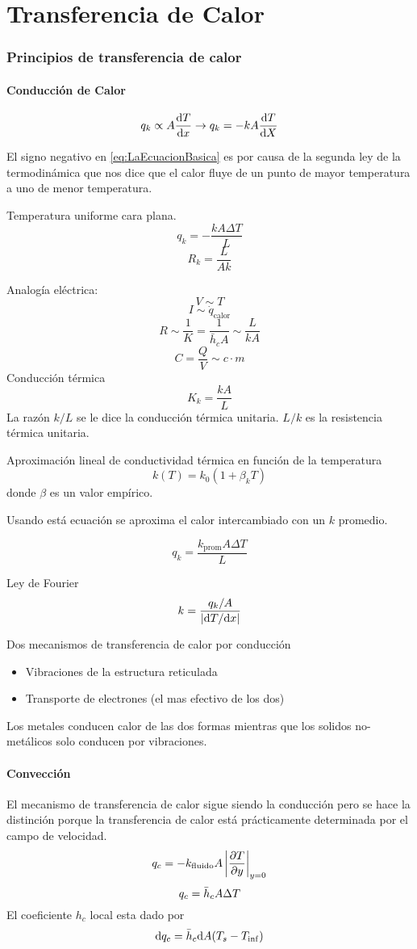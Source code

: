 \clearpage
\part{Transferencia de Calor}
\section{Principios de transferencia de calor}
\subsection{Conducción de Calor}
\begin{equation} \label{eq:LaEcuacionBasica}
    q_k\propto A\frac{\textrm{d} T}{\textrm{d} x}\rightarrow q_k=-kA\frac{\textrm{d} T}{\textrm{d} X}
\end{equation}

El signo negativo en \ref{eq:LaEcuacionBasica} es por causa de la segunda ley de la termodinámica que nos dice que el calor fluye de un punto de mayor temperatura a uno de menor temperatura.

Temperatura uniforme cara plana.
$$q_k=-\frac{kA\Delta T}{L} $$
$$R_k=\frac{L}{Ak}$$

Analogía eléctrica:
$$V\sim T $$
$$I \sim \dot{q}_{\text{calor}}$$
$$R\sim\frac{1}{K}= \frac{1}{\bar{h}_cA}\sim \frac{L}{kA} $$
$$C=\frac{Q}{V}\sim c\cdot m \si{}$$
Conducción térmica
$$K_k=\frac{kA}{L}$$
La razón $k/L$ se le dice la conducción térmica unitaria. $L/k$ es la  resistencia térmica unitaria.

Aproximación lineal de conductividad térmica en función de la temperatura
$$k(T)=k_0(1+\beta_kT)$$ donde $\beta$ es un valor empírico.

Usando está ecuación se aproxima el calor intercambiado con un $k$ promedio.

$$q_k=\frac{k_{\textrm{prom}}A\Delta T}{L}$$

Ley de Fourier
$$ k=\frac{q_k/A}{|\textrm{d} T/\textrm{d} x|}$$

Dos mecanismos de transferencia de calor por conducción
\begin{itemize}
    \item Vibraciones de la estructura reticulada
    \item Transporte de electrones (el mas efectivo de los dos)
\end{itemize}
Los metales conducen calor de las dos formas mientras que los solidos no-metálicos solo conducen por vibraciones.
\subsection{Convección}
El mecanismo de transferencia de calor sigue siendo la conducción pero se hace la distinción porque la transferencia de calor está prácticamente determinada por el campo de
velocidad.%
$$q_c=-k_{\textrm{fluido}}A\left| \frac{\partial T}{\partial y}\right|_{y=0} $$
$$q_c=\bar{h}_c A\Delta T $$
El coeficiente $h_c$ local esta dado por
$$ \textrm{d} q_c=\bar{h}_c \textrm{d} A(T_s-T_{\inf}) $$


